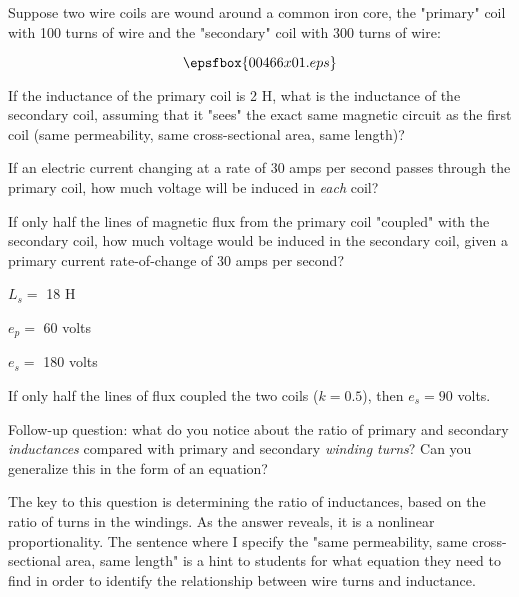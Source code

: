 

Suppose two wire coils are wound around a common iron core, the "primary" coil with 100 turns of wire and the "secondary" coil with 300 turns of wire:

$$\epsfbox{00466x01.eps}$$

If the inductance of the primary coil is 2 H, what is the inductance of the secondary coil, assuming that it "sees" the exact same magnetic circuit as the first coil (same permeability, same cross-sectional area, same length)?

If an electric current changing at a rate of 30 amps per second passes through the primary coil, how much voltage will be induced in {\it each} coil?

\vskip 10pt

If only half the lines of magnetic flux from the primary coil "coupled" with the secondary coil, how much voltage would be induced in the secondary coil, given a primary current rate-of-change of 30 amps per second?







$L_s =$ 18 H

$e_p =$ 60 volts

$e_s =$ 180 volts

\vskip 10pt

If only half the lines of flux coupled the two coils ($k = 0.5$), then $e_s = 90$ volts.

\vskip 10pt

Follow-up question: what do you notice about the ratio of primary and secondary {\it inductances} compared with primary and secondary {\it winding turns}?  Can you generalize this in the form of an equation?







The key to this question is determining the ratio of inductances, based on the ratio of turns in the windings.  As the answer reveals, it is a nonlinear proportionality.  The sentence where I specify the "same permeability, same cross-sectional area, same length" is a hint to students for what equation they need to find in order to identify the relationship between wire turns and inductance.




